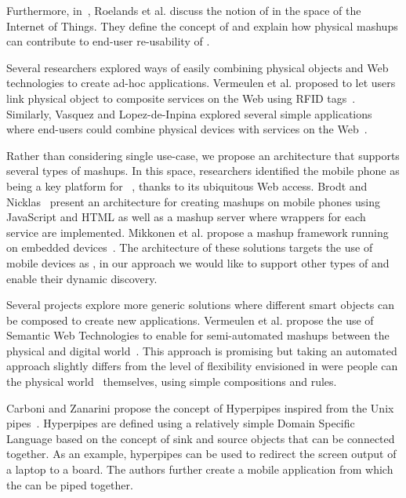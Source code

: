 Furthermore, in~\cite{Roelands2011}, Roelands et al. discuss the notion of  in the space of the Internet of Things. They define the concept of  and explain how physical mashups can contribute to end-user re-usability of \sts{}.

Several researchers explored ways of easily combining physical objects and Web technologies to create ad-hoc applications. Vermeulen et al. proposed to let users link physical object to composite services on the Web using RFID tags~\cite{Vermeulen2007}. Similarly, Vasquez and Lopez-de-Inpina explored several simple applications where end-users could combine physical devices with services on the Web~\cite{Vazquez2008}. 

Rather than considering single use-case, we propose an architecture that supports several types of mashups. In this space, researchers identified the mobile phone as being a key platform for \pMashups{}~\cite{Maximilien2008}, thanks to its ubiquitous Web access. Brodt and Nicklas~\cite{Brodt2008} present an architecture for creating mashups on mobile phones using JavaScript and HTML as well as a mashup server where wrappers for each service are implemented. Mikkonen et al. propose a mashup framework running on embedded devices~\cite{Mikkonen2010}. The architecture of these solutions targets the use of mobile devices as \sts{}, in our approach we would like to support other types of \sts{} and enable their dynamic discovery.

Several projects explore more generic solutions where different smart objects can be composed to create new applications. Vermeulen et al. propose the use of Semantic Web Technologies to enable for semi-automated mashups between the physical and digital world~\cite{Vermeulen2007a}. This approach is promising but taking an automated approach slightly differs from the level of flexibility envisioned in \pMashups{} were people can  the physical world~\cite{Hartmann2008} themselves, using simple compositions and rules.

Carboni and Zanarini propose the concept of Hyperpipes inspired from the Unix pipes~\cite{Carboni2007}. Hyperpipes are defined using a relatively simple Domain Specific Language based on the concept of sink and source objects that can be connected together. As an example, hyperpipes can be used to redirect the screen output of a laptop to a board. The authors further create a mobile application from which the \sts{} can be piped together.

